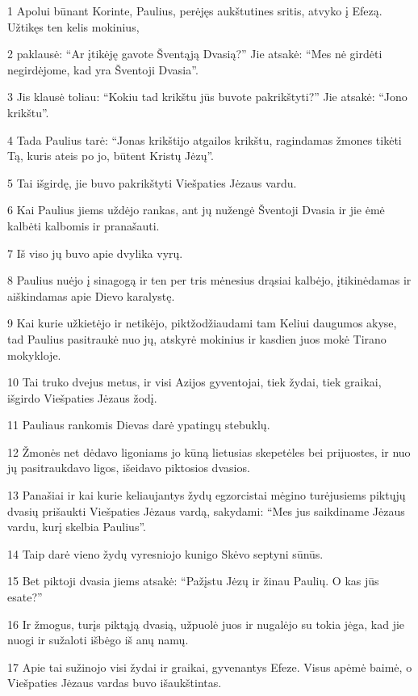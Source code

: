 \par 1 Apolui būnant Korinte, Paulius, perėjęs aukštutines sritis, atvyko į Efezą. Užtikęs ten kelis mokinius, 
\par 2 paklausė: “Ar įtikėję gavote Šventąją Dvasią?” Jie atsakė: “Mes nė girdėti negirdėjome, kad yra Šventoji Dvasia”. 
\par 3 Jis klausė toliau: “Kokiu tad krikštu jūs buvote pakrikštyti?” Jie atsakė: “Jono krikštu”. 
\par 4 Tada Paulius tarė: “Jonas krikštijo atgailos krikštu, ragindamas žmones tikėti Tą, kuris ateis po jo, būtent Kristų Jėzų”. 
\par 5 Tai išgirdę, jie buvo pakrikštyti Viešpaties Jėzaus vardu. 
\par 6 Kai Paulius jiems uždėjo rankas, ant jų nužengė Šventoji Dvasia ir jie ėmė kalbėti kalbomis ir pranašauti. 
\par 7 Iš viso jų buvo apie dvylika vyrų. 
\par 8 Paulius nuėjo į sinagogą ir ten per tris mėnesius drąsiai kalbėjo, įtikinėdamas ir aiškindamas apie Dievo karalystę. 
\par 9 Kai kurie užkietėjo ir netikėjo, piktžodžiaudami tam Keliui daugumos akyse, tad Paulius pasitraukė nuo jų, atskyrė mokinius ir kasdien juos mokė Tirano mokykloje. 
\par 10 Tai truko dvejus metus, ir visi Azijos gyventojai, tiek žydai, tiek graikai, išgirdo Viešpaties Jėzaus žodį. 
\par 11 Pauliaus rankomis Dievas darė ypatingų stebuklų. 
\par 12 Žmonės net dėdavo ligoniams jo kūną lietusias skepetėles bei prijuostes, ir nuo jų pasitraukdavo ligos, išeidavo piktosios dvasios. 
\par 13 Panašiai ir kai kurie keliaujantys žydų egzorcistai mėgino turėjusiems piktųjų dvasių prišaukti Viešpaties Jėzaus vardą, sakydami: “Mes jus saikdiname Jėzaus vardu, kurį skelbia Paulius”. 
\par 14 Taip darė vieno žydų vyresniojo kunigo Skėvo septyni sūnūs. 
\par 15 Bet piktoji dvasia jiems atsakė: “Pažįstu Jėzų ir žinau Paulių. O kas jūs esate?” 
\par 16 Ir žmogus, turįs piktąją dvasią, užpuolė juos ir nugalėjo su tokia jėga, kad jie nuogi ir sužaloti išbėgo iš anų namų. 
\par 17 Apie tai sužinojo visi žydai ir graikai, gyvenantys Efeze. Visus apėmė baimė, o Viešpaties Jėzaus vardas buvo išaukštintas. 
